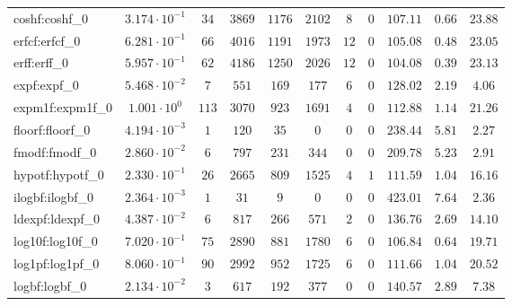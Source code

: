 \begin{tabular}{|l|c|c|c|c|c|c|c|c|c|c|}
coshf:coshf\_0               & $ 3.174 \cdot 10^{-1} $ & $ 34     $ & $ 3869  $ & $ 1176  $ & $ 2102  $ & $ 8   $ & $ 0 $ & $ 107.11      $ & $ 0.66    $ & $ 23.88   $ \\
erfcf:erfcf\_0               & $ 6.281 \cdot 10^{-1} $ & $ 66     $ & $ 4016  $ & $ 1191  $ & $ 1973  $ & $ 12  $ & $ 0 $ & $ 105.08      $ & $ 0.48    $ & $ 23.05   $ \\
erff:erff\_0                 & $ 5.957 \cdot 10^{-1} $ & $ 62     $ & $ 4186  $ & $ 1250  $ & $ 2026  $ & $ 12  $ & $ 0 $ & $ 104.08      $ & $ 0.39    $ & $ 23.13   $ \\
expf:expf\_0                 & $ 5.468 \cdot 10^{-2} $ & $ 7      $ & $ 551   $ & $ 169   $ & $ 177   $ & $ 6   $ & $ 0 $ & $ 128.02      $ & $ 2.19    $ & $ 4.06    $ \\
expm1f:expm1f\_0             & $ 1.001 \cdot 10^{0}  $ & $ 113    $ & $ 3070  $ & $ 923   $ & $ 1691  $ & $ 4   $ & $ 0 $ & $ 112.88      $ & $ 1.14    $ & $ 21.26   $ \\
floorf:floorf\_0             & $ 4.194 \cdot 10^{-3} $ & $ 1      $ & $ 120   $ & $ 35    $ & $ 0     $ & $ 0   $ & $ 0 $ & $ 238.44      $ & $ 5.81    $ & $ 2.27    $ \\
fmodf:fmodf\_0               & $ 2.860 \cdot 10^{-2} $ & $ 6      $ & $ 797   $ & $ 231   $ & $ 344   $ & $ 0   $ & $ 0 $ & $ 209.78      $ & $ 5.23    $ & $ 2.91    $ \\
hypotf:hypotf\_0             & $ 2.330 \cdot 10^{-1} $ & $ 26     $ & $ 2665  $ & $ 809   $ & $ 1525  $ & $ 4   $ & $ 1 $ & $ 111.59      $ & $ 1.04    $ & $ 16.16   $ \\
ilogbf:ilogbf\_0             & $ 2.364 \cdot 10^{-3} $ & $ 1      $ & $ 31    $ & $ 9     $ & $ 0     $ & $ 0   $ & $ 0 $ & $ 423.01      $ & $ 7.64    $ & $ 2.36    $ \\
ldexpf:ldexpf\_0             & $ 4.387 \cdot 10^{-2} $ & $ 6      $ & $ 817   $ & $ 266   $ & $ 571   $ & $ 2   $ & $ 0 $ & $ 136.76      $ & $ 2.69    $ & $ 14.10   $ \\
log10f:log10f\_0             & $ 7.020 \cdot 10^{-1} $ & $ 75     $ & $ 2890  $ & $ 881   $ & $ 1780  $ & $ 6   $ & $ 0 $ & $ 106.84      $ & $ 0.64    $ & $ 19.71   $ \\
log1pf:log1pf\_0             & $ 8.060 \cdot 10^{-1} $ & $ 90     $ & $ 2992  $ & $ 952   $ & $ 1725  $ & $ 6   $ & $ 0 $ & $ 111.66      $ & $ 1.04    $ & $ 20.52   $ \\
logbf:logbf\_0               & $ 2.134 \cdot 10^{-2} $ & $ 3      $ & $ 617   $ & $ 192   $ & $ 377   $ & $ 0   $ & $ 0 $ & $ 140.57      $ & $ 2.89    $ & $ 7.38    $ \\

\end{tabular}
